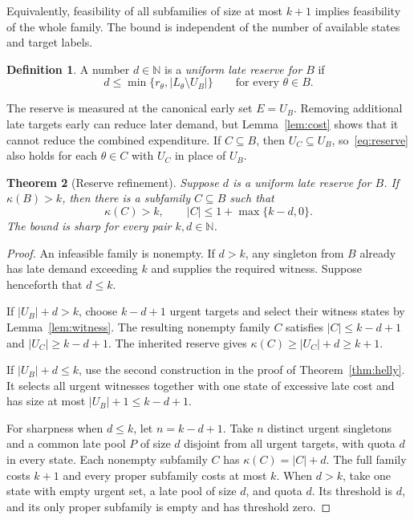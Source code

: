 \documentclass[11pt,a4paper]{amsart}
\newtheorem{theorem}{Theorem}[section]
\theoremstyle{definition}
\newtheorem{definition}[theorem]{Definition}
\theoremstyle{remark}
\newcommand{\N}{\mathbb N}
\newcommand{\card}[1]{\lvert #1\rvert}
\begin{document}
Equivalently, feasibility of all subfamilies of size at most $k+1$
implies feasibility of the whole family. The bound is independent of
the number of available states and target labels.

\begin{definition}
A number $d\in\N$ is a \emph{uniform late reserve for $B$} if
\begin{equation}\label{eq:reserve}
 d\le\min\{r_\theta,\card{L_\theta\setminus U_B}\}
 \qquad\text{for every }\theta\in B.
\end{equation}
\end{definition}

The reserve is measured at the canonical early set $E=U_B$. Removing
additional late targets early can reduce later demand, but
Lemma~\ref{lem:cost} shows that it cannot reduce the combined expenditure.
If $C\subseteq B$, then
$U_C\subseteq U_B$, so~\eqref{eq:reserve} also holds for each
$\theta\in C$ with $U_C$ in place of $U_B$.

\begin{theorem}[Reserve refinement]\label{thm:reserve}
Suppose $d$ is a uniform late reserve for $B$. If $\kappa(B)>k$, then
there is a subfamily $C\subseteq B$ such that
\[
 \kappa(C)>k,
 \qquad \card C\le 1+\max\{k-d,0\}.
\]
The bound is sharp for every pair $k,d\in\N$.
\end{theorem}
\begin{proof}
An infeasible family is nonempty. If $d>k$, any singleton from $B$
already has late demand exceeding $k$ and supplies the required witness.
Suppose henceforth that $d\le k$.

If $\card{U_B}+d>k$, choose $k-d+1$ urgent targets and select their
witness states by Lemma~\ref{lem:witness}. The resulting nonempty family
$C$ satisfies $\card C\le k-d+1$ and $\card{U_C}\ge k-d+1$.
The inherited reserve gives
$\kappa(C)\ge\card{U_C}+d\ge k+1$.

If $\card{U_B}+d\le k$, use the second construction in the proof of
Theorem~\ref{thm:helly}. It selects all urgent witnesses together with
one state of excessive late cost and has size at most
$\card{U_B}+1\le k-d+1$.

For sharpness when $d\le k$, let $n=k-d+1$. Take $n$ distinct urgent
singletons and a common late pool $P$ of size $d$ disjoint from all
urgent targets, with quota $d$ in every state. Each nonempty subfamily
$C$ has $\kappa(C)=\card C+d$. The full family costs $k+1$ and every
proper subfamily costs at most $k$. When $d>k$, take one state with
empty urgent set, a late pool of size $d$, and quota $d$. Its threshold
is $d$, and its only proper subfamily is empty and has threshold zero.
\end{proof}
\end{document}
